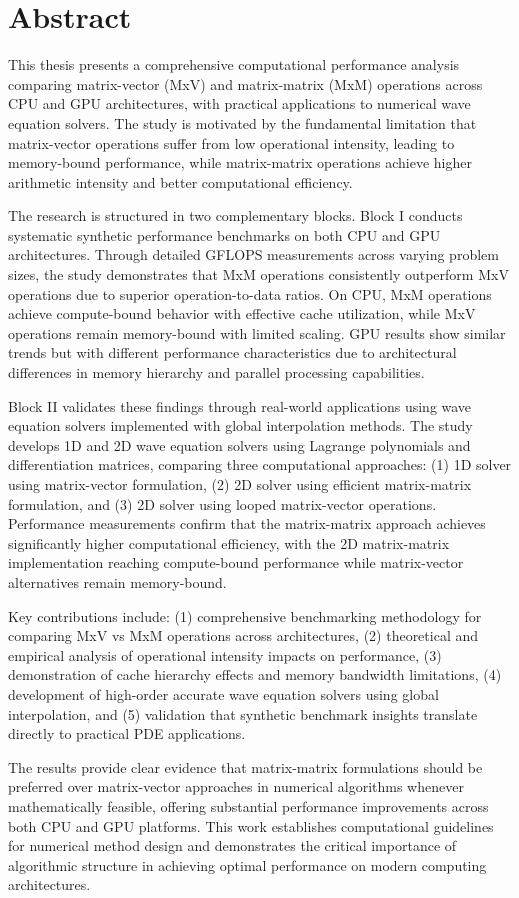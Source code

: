 %

\section*{Abstract}
\label{sec::abstract}

This thesis presents a comprehensive computational performance analysis comparing matrix-vector (MxV) and matrix-matrix (MxM) operations across CPU and GPU architectures, with practical applications to numerical wave equation solvers. The study is motivated by the fundamental limitation that matrix-vector operations suffer from low operational intensity, leading to memory-bound performance, while matrix-matrix operations achieve higher arithmetic intensity and better computational efficiency.

The research is structured in two complementary blocks. Block I conducts systematic synthetic performance benchmarks on both CPU and GPU architectures. Through detailed GFLOPS measurements across varying problem sizes, the study demonstrates that MxM operations consistently outperform MxV operations due to superior operation-to-data ratios. On CPU, MxM operations achieve compute-bound behavior with effective cache utilization, while MxV operations remain memory-bound with limited scaling. GPU results show similar trends but with different performance characteristics due to architectural differences in memory hierarchy and parallel processing capabilities.

Block II validates these findings through real-world applications using wave equation solvers implemented with global interpolation methods. The study develops 1D and 2D wave equation solvers using Lagrange polynomials and differentiation matrices, comparing three computational approaches: (1) 1D solver using matrix-vector formulation, (2) 2D solver using efficient matrix-matrix formulation, and (3) 2D solver using looped matrix-vector operations. Performance measurements confirm that the matrix-matrix approach achieves significantly higher computational efficiency, with the 2D matrix-matrix implementation reaching compute-bound performance while matrix-vector alternatives remain memory-bound.

Key contributions include: (1) comprehensive benchmarking methodology for comparing MxV vs MxM operations across architectures, (2) theoretical and empirical analysis of operational intensity impacts on performance, (3) demonstration of cache hierarchy effects and memory bandwidth limitations, (4) development of high-order accurate wave equation solvers using global interpolation, and (5) validation that synthetic benchmark insights translate directly to practical PDE applications.

The results provide clear evidence that matrix-matrix formulations should be preferred over matrix-vector approaches in numerical algorithms whenever mathematically feasible, offering substantial performance improvements across both CPU and GPU platforms. This work establishes computational guidelines for numerical method design and demonstrates the critical importance of algorithmic structure in achieving optimal performance on modern computing architectures.